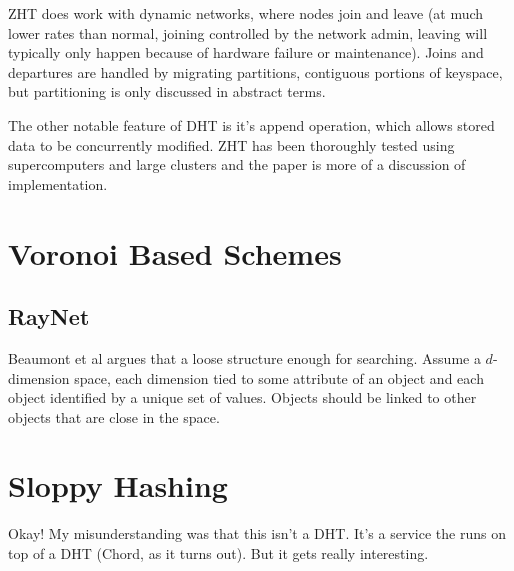 \documentclass[10pt,letterpaper]{report}
\begin{document}
ZHT does work with dynamic networks, where nodes join and leave (at much lower rates than normal,  joining controlled by the network admin, leaving will typically only happen because of hardware failure or maintenance).  Joins and departures  are handled by migrating partitions, contiguous portions of keyspace, but partitioning is only discussed in abstract terms.

The other notable feature of DHT is it's append operation, which allows stored data  to be concurrently modified.  ZHT has been thoroughly tested using  supercomputers and large clusters and the paper is more of a discussion of implementation. 



\section{Voronoi Based Schemes}



\subsection{RayNet}

Beaumont et al argues that a loose structure enough for searching.  Assume a $d$-dimension space, each dimension tied to some attribute of an object and each object identified by a unique set of values.  Objects should be linked to other objects that are close in the space.


\section{Sloppy Hashing}

Okay!  My misunderstanding was that this isn't a DHT.  It's a service the runs on top of a DHT (Chord, as it turns out).  But it gets really interesting.
\end{document}
